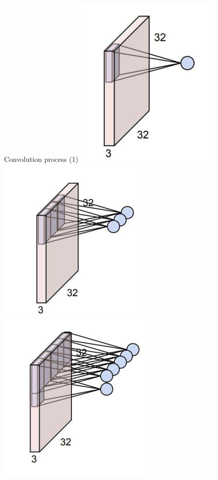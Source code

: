 \documentclass[default, aspectratio=169]{beamer}
\begin{document}
	\begin{frame}{Convolution process (1)}
		\centering
		\includegraphics[keepaspectratio, scale=0.7]{pic/img2.png}
		\includegraphics[keepaspectratio, scale=0.7]{pic/img3.png}
		\includegraphics[keepaspectratio, scale=0.7]{pic/img4.png}	
		
	\end{frame}
\end{document}
